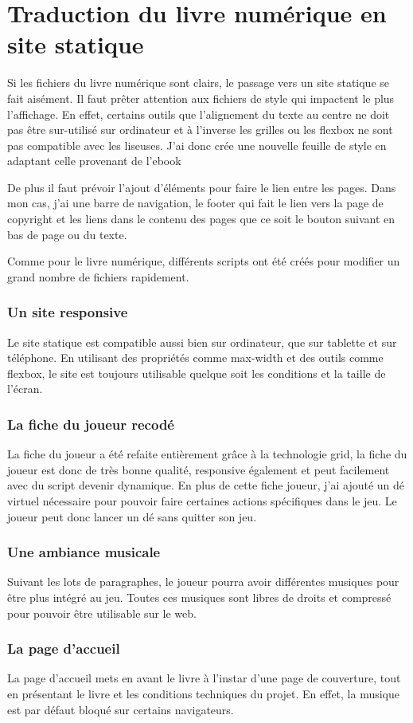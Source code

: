\documentclass{article}
\begin{document}
\part{Traduction du livre numérique en site statique}
\setcounter{section}{0}

Si les fichiers du livre numérique sont clairs, le passage vers un site statique se fait aisément. Il faut prêter attention aux fichiers de style qui impactent le plus l'affichage. En effet, certains outils que l'alignement du texte au centre ne doit pas être sur-utilisé sur ordinateur et à l'inverse les grilles ou les flexbox ne sont pas compatible avec les liseuses. J'ai donc crée une nouvelle feuille de style en adaptant celle provenant de l'ebook 

De plus il faut prévoir l'ajout d'éléments pour faire le lien entre les pages. Dans mon cas, j'ai une barre de navigation, le footer qui fait le lien vers la page de copyright et les liens dans le contenu des pages que ce soit le bouton suivant en bas de page ou du texte.

Comme pour le livre numérique, différents scripts ont été créés pour modifier un grand nombre de fichiers rapidement.

\section{Un site responsive}
Le site statique est compatible aussi bien sur ordinateur, que sur tablette et sur téléphone. En utilisant des propriétés comme max-width et des outils comme flexbox, le site est toujours utilisable quelque soit les conditions et la taille de l'écran.

\section{La fiche du joueur recodé}
La fiche du joueur a été refaite entièrement grâce à la technologie grid, la fiche du joueur est donc de très bonne qualité, responsive également et peut facilement avec du script devenir dynamique. En plus de cette fiche joueur, j'ai ajouté un dé virtuel nécessaire pour pouvoir faire certaines actions spécifiques dans le jeu. Le joueur peut donc lancer un dé sans quitter son jeu.

\section{Une ambiance musicale}
Suivant les lots de paragraphes, le joueur pourra avoir différentes musiques pour être plus intégré au jeu. Toutes ces musiques sont libres de droits et compressé pour pouvoir être utilisable sur le web.

\section{La page d'accueil}
La page d'accueil mets en avant le livre à l'instar d'une page de couverture, tout en présentant le livre et les conditions techniques du projet. En effet, la musique est par défaut bloqué sur certains navigateurs.
\end{document}
